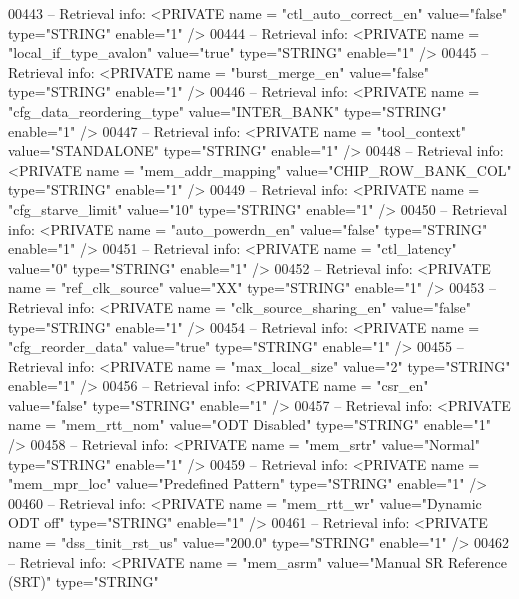 \begin{DoxyCode}
{00443 \textcolor{keyword}{-- Retrieval info:      <PRIVATE name = "ctl\_auto\_correct\_en" value="false"  type="STRING"  enable="1" />}
00444 \textcolor{keyword}{-- Retrieval info:      <PRIVATE name = "local\_if\_type\_avalon" value="true"  type="STRING"  enable="1" />}
00445 \textcolor{keyword}{-- Retrieval info:      <PRIVATE name = "burst\_merge\_en" value="false"  type="STRING"  enable="1" />}
00446 \textcolor{keyword}{-- Retrieval info:      <PRIVATE name = "cfg\_data\_reordering\_type" value="INTER\_BANK"  type="STRING" 
       enable="1" />}
00447 \textcolor{keyword}{-- Retrieval info:      <PRIVATE name = "tool\_context" value="STANDALONE"  type="STRING"  enable="1" />}
00448 \textcolor{keyword}{-- Retrieval info:      <PRIVATE name = "mem\_addr\_mapping" value="CHIP\_ROW\_BANK\_COL"  type="STRING" 
       enable="1" />}
00449 \textcolor{keyword}{-- Retrieval info:      <PRIVATE name = "cfg\_starve\_limit" value="10"  type="STRING"  enable="1" />}
00450 \textcolor{keyword}{-- Retrieval info:      <PRIVATE name = "auto\_powerdn\_en" value="false"  type="STRING"  enable="1" />}
00451 \textcolor{keyword}{-- Retrieval info:      <PRIVATE name = "ctl\_latency" value="0"  type="STRING"  enable="1" />}
00452 \textcolor{keyword}{-- Retrieval info:      <PRIVATE name = "ref\_clk\_source" value="XX"  type="STRING"  enable="1" />}
00453 \textcolor{keyword}{-- Retrieval info:      <PRIVATE name = "clk\_source\_sharing\_en" value="false"  type="STRING"  enable="1" />}
00454 \textcolor{keyword}{-- Retrieval info:      <PRIVATE name = "cfg\_reorder\_data" value="true"  type="STRING"  enable="1" />}
00455 \textcolor{keyword}{-- Retrieval info:      <PRIVATE name = "max\_local\_size" value="2"  type="STRING"  enable="1" />}
00456 \textcolor{keyword}{-- Retrieval info:      <PRIVATE name = "csr\_en" value="false"  type="STRING"  enable="1" />}
00457 \textcolor{keyword}{-- Retrieval info:      <PRIVATE name = "mem\_rtt\_nom" value="ODT Disabled"  type="STRING"  enable="1" />}
00458 \textcolor{keyword}{-- Retrieval info:      <PRIVATE name = "mem\_srtr" value="Normal"  type="STRING"  enable="1" />}
00459 \textcolor{keyword}{-- Retrieval info:      <PRIVATE name = "mem\_mpr\_loc" value="Predefined Pattern"  type="STRING"  enable="1"
       />}
00460 \textcolor{keyword}{-- Retrieval info:      <PRIVATE name = "mem\_rtt\_wr" value="Dynamic ODT off"  type="STRING"  enable="1" />}
00461 \textcolor{keyword}{-- Retrieval info:      <PRIVATE name = "dss\_tinit\_rst\_us" value="200.0"  type="STRING"  enable="1" />}
00462 \textcolor{keyword}{-- Retrieval info:      <PRIVATE name = "mem\_asrm" value="Manual SR Reference (SRT)"  type="STRING" 
}}
\end{DoxyCode}
